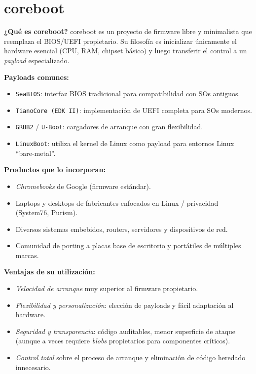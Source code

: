 \section{coreboot}

\textbf{¿Qué es coreboot?}  
coreboot es un proyecto de firmware libre y minimalista que reemplaza el BIOS/UEFI propietario. Su filosofía es inicializar únicamente el hardware esencial (CPU, RAM, chipset básico) y luego transferir el control a un \emph{payload} especializado.

\medskip
\textbf{Payloads comunes:}
\begin{itemize}[noitemsep]
  \item \texttt{SeaBIOS}: interfaz BIOS tradicional para compatibilidad con SOs antiguos.
  \item \texttt{TianoCore (EDK II)}: implementación de UEFI completa para SOs modernos.
  \item \texttt{GRUB2} / \texttt{U-Boot}: cargadores de arranque con gran flexibilidad.
  \item \texttt{LinuxBoot}: utiliza el kernel de Linux como payload para entornos Linux “bare-metal”.
\end{itemize}

\newpage

\medskip
\textbf{Productos que lo incorporan:}
\begin{itemize}[noitemsep]
  \item \emph{Chromebooks} de Google (firmware estándar).
  \item Laptops y desktops de fabricantes enfocados en Linux / privacidad (System76, Purism).
  \item Diversos sistemas embebidos, routers, servidores y dispositivos de red.
  \item Comunidad de porting a placas base de escritorio y portátiles de múltiples marcas.
\end{itemize}

\medskip
\textbf{Ventajas de su utilización:}
\begin{itemize}[noitemsep]
  \item \emph{Velocidad de arranque} muy superior al firmware propietario.
  \item \emph{Flexibilidad y personalización}: elección de payloads y fácil adaptación al hardware.
  \item \emph{Seguridad y transparencia}: código auditables, menor superficie de ataque (aunque a veces requiere \emph{blobs} propietarios para componentes críticos).
  \item \emph{Control total} sobre el proceso de arranque y eliminación de código heredado innecesario.
\end{itemize}
